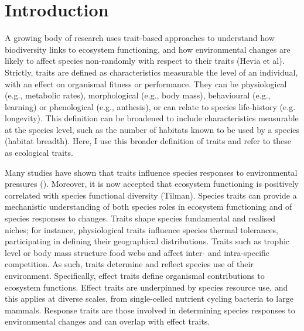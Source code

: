 \section{Introduction}

A growing body of research uses trait-based approaches to understand how biodiversity links to ecosystem functioning, and how environmental changes are likely to affect species non-randomly with respect to their traits (Hevia et al). Strictly, traits are defined as characteristics measurable the level of an individual, with an effect on organismal fitness or performance. They can be physiological (e.g., metabolic rates), morphological (e.g., body mass), behavioural (e.g., learning) or phenological (e.g., anthesis), or can relate to species life-history (e.g. longevity). This definition can be broadened to include characteristics measurable at the species level, such as the number of habitats known to be used by a species (habitat breadth). Here, I use this broader definition of traits and refer to these as ecological traits.

Many studies have shown that traits influence species responses to environmental pressures (). Moreover, it is now accepted that ecosystem functioning is positively correlated with species functional diversity (Tilman). Species traits can provide a mechanistic understanding of both species roles in ecosystem functioning and of species responses to changes. Traits shape species fundamental and realised niches; for instance, physiological traits influence species thermal tolerances, participating in defining their geographical distributions. Traits such as trophic level or body mass structure food webs and affect inter- and intra-specific competition. As such, traits determine and reflect species use of their environment. Specifically, effect traits define organismal contributions to ecosystem functions. Effect traits are underpinned by species resource use, and this applies at diverse scales, from single-celled nutrient cycling bacteria to large mammals. Response traits are those involved in determining species responses to environmental changes and can overlap with effect traits. 

